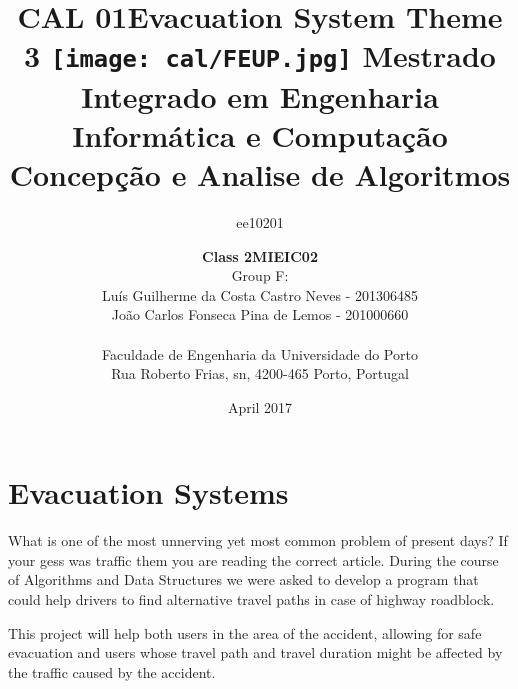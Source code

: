 \documentclass{article}
\title{CAL 01}
\author{ee10201 }
\date{April 2017}
\begin{document}
\setlength{\textwidth}{16cm}
\setlength{\textheight}{22cm}

\title{\Huge\textbf{Evacuation System}\linebreak\linebreak
\Large\textbf{Theme 3}\linebreak
\texttt{[image: cal/FEUP.jpg]} \linebreak\linebreak
\linebreak
\Large{Mestrado Integrado em Engenharia Informática e Computação} \linebreak\linebreak
\Large{Concepção e Analise de Algoritmos}\linebreak
}

\author{\textbf{Class 2MIEIC02}\\ Group F:
\\ Luís Guilherme da Costa Castro Neves - 201306485 
\\ João Carlos Fonseca Pina de Lemos - 201000660
\linebreak\linebreak \\
 \\ Faculdade de Engenharia da Universidade do Porto \\ Rua Roberto Frias, s\/n, 4200-465 Porto, Portugal \linebreak\linebreak\linebreak
\linebreak\linebreak\vspace{1cm}}

\maketitle
\thispagestyle{empty}
\newpage
\tableofcontents
{}
\newpage
{}
\section{Evacuation Systems}
What is one of the most unnerving yet most common problem of present days? If your gess was traffic them you are reading the correct article. During the course of Algorithms and Data Structures we were asked to develop a program that could help drivers to find alternative travel paths in case of highway roadblock.

This project will help both users in the area of the accident, allowing for safe evacuation and users whose travel path and travel duration might be affected by the traffic caused by the accident.
\end{document}
